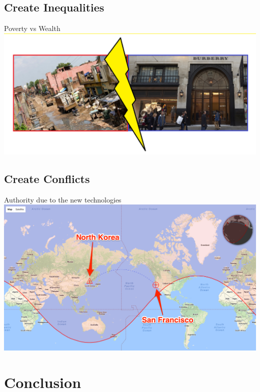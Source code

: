 \documentclass{beamer}
\begin{document}
\subsection{Create Inequalities}

 \begin{frame}
\begin{block}{Poverty vs Wealth} 
	\includegraphics[scale=0.3]{pics/image7.png}
\end{block}
\end{frame}

\subsection{Create Conflicts}

 \begin{frame}
\begin{block}{Authority due to the new technologies} 
	\includegraphics[scale=0.25]{pics/image8.png}
\end{block}
\end{frame}

\section{Conclusion}
\end{document}
